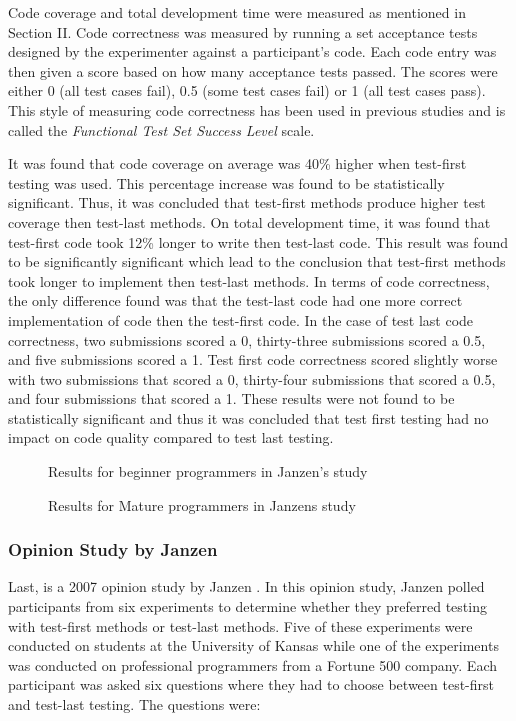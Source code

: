 \documentclass{sig-alternate}
\begin{document}
Code coverage and total development time were measured as mentioned in Section II.  Code correctness was measured by running a set acceptance tests designed by the experimenter against a participant's code. Each code entry was then given a score based on how many acceptance tests passed.  The scores were either 0 (all test cases fail), 0.5 (some test cases fail) or 1 (all test cases pass).  This style of measuring code correctness has been used in previous studies and is called the \textit{Functional Test Set Success Level} scale.

It was found that code coverage on average was 40\% higher when test-first testing was used.  This percentage increase was found to be statistically significant. Thus, it was concluded that test-first methods produce higher test coverage then test-last methods. On total development time, it was found that test-first code took 12\% longer to write then test-last code.  This result was found to be significantly significant which lead to the conclusion that test-first methods took longer to implement then test-last methods. In terms of code correctness, the only difference found was that the test-last code had one more correct implementation of code then the test-first code.  In the case of test last code correctness, two submissions scored a 0, thirty-three submissions scored a 0.5, and five submissions scored a 1.  Test first code correctness scored slightly worse with two submissions that scored a 0, thirty-four submissions that scored a 0.5, and four submissions that scored a 1.  These results were not found to be statistically significant and thus it was concluded that test first testing had no impact on code quality compared to test last testing.

\begin{figure}
\centering
{}
\caption{Results for beginner programmers in Janzen's study}
\end{figure}

\begin{figure}
\centering
{}
\caption{Results for Mature programmers in Janzens study}
\end{figure}

\subsubsection{Opinion Study by Janzen}

Last, is a 2007 opinion study by Janzen \cite{Janzen:2007}.  In this opinion study, Janzen polled participants from six experiments to determine whether they preferred testing with test-first methods or test-last methods.  Five of these experiments were conducted on students at the University of Kansas while one of the experiments was conducted on professional programmers from a Fortune 500 company.  Each participant was asked six questions where they had to choose between test-first and test-last testing.  The questions were:
\end{document}
